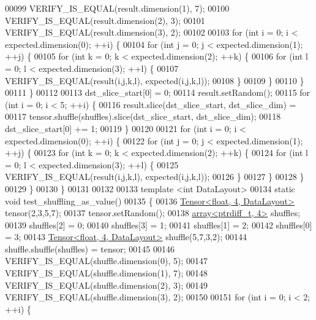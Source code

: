 \begin{DoxyCode}
00099   VERIFY\_IS\_EQUAL(result.dimension(1), 7);
00100   VERIFY\_IS\_EQUAL(result.dimension(2), 3);
00101   VERIFY\_IS\_EQUAL(result.dimension(3), 2);
00102 
00103   \textcolor{keywordflow}{for} (\textcolor{keywordtype}{int} i = 0; i < expected.dimension(0); ++i) \{
00104     \textcolor{keywordflow}{for} (\textcolor{keywordtype}{int} j = 0; j < expected.dimension(1); ++j) \{
00105       \textcolor{keywordflow}{for} (\textcolor{keywordtype}{int} k = 0; k < expected.dimension(2); ++k) \{
00106         \textcolor{keywordflow}{for} (\textcolor{keywordtype}{int} l = 0; l < expected.dimension(3); ++l) \{
00107           VERIFY\_IS\_EQUAL(result(i,j,k,l), expected(i,j,k,l));
00108         \}
00109       \}
00110     \}
00111   \}
00112 
00113   dst\_slice\_start[0] = 0;
00114   result.setRandom();
00115   \textcolor{keywordflow}{for} (\textcolor{keywordtype}{int} i = 0; i < 5; ++i) \{
00116     result.slice(dst\_slice\_start, dst\_slice\_dim) =
00117         tensor.shuffle(shuffles).slice(dst\_slice\_start, dst\_slice\_dim);
00118     dst\_slice\_start[0] += 1;
00119   \}
00120 
00121   \textcolor{keywordflow}{for} (\textcolor{keywordtype}{int} i = 0; i < expected.dimension(0); ++i) \{
00122     \textcolor{keywordflow}{for} (\textcolor{keywordtype}{int} j = 0; j < expected.dimension(1); ++j) \{
00123       \textcolor{keywordflow}{for} (\textcolor{keywordtype}{int} k = 0; k < expected.dimension(2); ++k) \{
00124         \textcolor{keywordflow}{for} (\textcolor{keywordtype}{int} l = 0; l < expected.dimension(3); ++l) \{
00125           VERIFY\_IS\_EQUAL(result(i,j,k,l), expected(i,j,k,l));
00126         \}
00127       \}
00128     \}
00129   \}
00130 \}
00131 
00132 
00133 \textcolor{keyword}{template} <\textcolor{keywordtype}{int} DataLayout>
00134 \textcolor{keyword}{static} \textcolor{keywordtype}{void} test\_shuffling\_as\_value()
00135 \{
00136   \hyperlink{class_eigen_1_1_tensor}{Tensor<float, 4, DataLayout>} tensor(2,3,5,7);
00137   tensor.setRandom();
00138   \hyperlink{class_eigen_1_1array}{array<ptrdiff\_t, 4>} shuffles;
00139   shuffles[2] = 0;
00140   shuffles[3] = 1;
00141   shuffles[1] = 2;
00142   shuffles[0] = 3;
00143   \hyperlink{class_eigen_1_1_tensor}{Tensor<float, 4, DataLayout>} shuffle(5,7,3,2);
00144   shuffle.shuffle(shuffles) = tensor;
00145 
00146   VERIFY\_IS\_EQUAL(shuffle.dimension(0), 5);
00147   VERIFY\_IS\_EQUAL(shuffle.dimension(1), 7);
00148   VERIFY\_IS\_EQUAL(shuffle.dimension(2), 3);
00149   VERIFY\_IS\_EQUAL(shuffle.dimension(3), 2);
00150 
00151   \textcolor{keywordflow}{for} (\textcolor{keywordtype}{int} i = 0; i < 2; ++i) \{

\end{DoxyCode}
